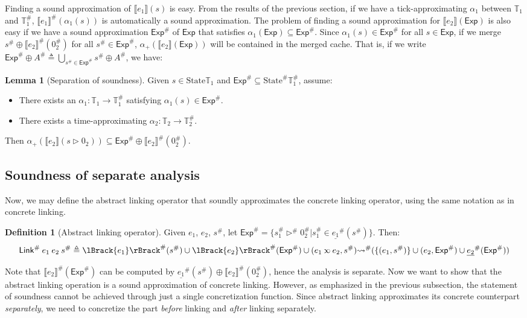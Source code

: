 \documentclass[acmsmall,review]{acmart}\settopmatter{printfolios=true,printccs=false,printacmref=false}
\theoremstyle{definition}
\newtheorem{definition}{Definition}[section]
\newtheorem{lem}{Lemma}[section]
\newcommand*{\A}[1]{{#1}^{\#}}
\newcommand*{\Time}{\mathbb{T}}
\newcommand*{\ATime}{\A{\Time}}
\newcommand*{\State}{\text{State}}
\newcommand*{\AState}{\A{\text{State}}}
\newcommand*{\semarrow}{\rightsquigarrow}
\newcommand*{\semlink}{\mathbin{\rotatebox[origin=c]{180}{$\propto$}}}
\newcommand*{\link}[2]{{#1}\semlink{#2}}
\newcommand*{\Exp}{\mathsf{Exp}}
\newcommand*{\Link}{\mathsf{Link}}
\newcommand*{\sembracket}[1]{\lBrack{#1}\rBrack}
\begin{document}
Finding a sound approximation of $\sembracket{e_1}(s)$ is easy.
From the results of the previous section, if we have a tick-approximating $\alpha_1$ between $\Time_1$ and $\ATime_1$, $\A{\sembracket{e_1}}(\alpha_1(s))$ is automatically a sound approximation.
The problem of finding a sound approximation for $\sembracket{e_2}(\Exp)$ is also easy if we have a sound approximation $\A\Exp$ of $\Exp$ that satisfies $\alpha_1(\Exp)\subseteq\A\Exp$.
Since $\alpha_1(s)\in\A\Exp$ for all $s\in\Exp$, if we merge $\A{s}\oplus\A{\sembracket{e_2}}(\A{0}_2)$ for all $\A{s}\in\A\Exp$, $\alpha_+(\sembracket{e_2}(\Exp))$ will be contained in the merged cache.
That is, if we write $\A{\Exp}\oplus\A{A}\triangleq\bigcup_{\A{s}\in\A\Exp}\A{s}\oplus\A{A}$, we have:
\begin{lem}[Separation of soundness]
  Given $s\in\State{\Time_1}$ and $\A\Exp\subseteq\AState{\ATime_1}$, assume:
  \begin{itemize}
    \item There exists an $\alpha_1:\Time_1\rightarrow\ATime_1$ satisfying $\alpha_1(s)\in\A{\Exp}$.
    \item There exists a time-approximating $\alpha_2:\Time_2\rightarrow\ATime_2$.
  \end{itemize}

  Then $\alpha_+(\sembracket{e_2}(s\rhd0_2))\subseteq\A\Exp\oplus\A{\sembracket{e_2}}(\A{0}_2)$.
\end{lem}

\subsection{Soundness of separate analysis}
Now, we may define the abstract linking operator that soundly approximates the concrete linking operator, using the same notation as in concrete linking.
\begin{definition}[Abstract linking operator]
  Given $e_1$, $e_2$, $\A{s}$, let $\A\Exp=\{\A{s}_1\A\rhd\A{0}_2|\A{s}_1\in\A{\underline{e_1}}(\A{s})\}$. Then:
  \[\A\Link\:e_1\:e_2\:\A{s}\triangleq\A{\sembracket{e_1}}(\A{s})\cup\A{\sembracket{e_2}}(\A\Exp)\cup(\link{e_1}{e_2},\A{s})\A\semarrow(\{(e_1,\A{s})\}\cup(e_2,\A\Exp)\cup\A{\underline{e_2}}(\A\Exp))\]
\end{definition}
Note that $\A{\sembracket{e_2}}(\A\Exp)$ can be computed by $\A{\underline{e_1}}(\A{s})\oplus\A{\sembracket{e_2}}(\A{0}_2)$, hence the analysis is separate.
Now we want to show that the abstract linking operation is a sound approximation of concrete linking.
However, as emphasized in the previous subsection, the statement of soundness cannot be achieved through just a single concretization function.
Since abstract linking approximates its concrete counterpart \emph{separately}, we need to concretize the part \emph{before} linking and \emph{after} linking separately.
\end{document}
